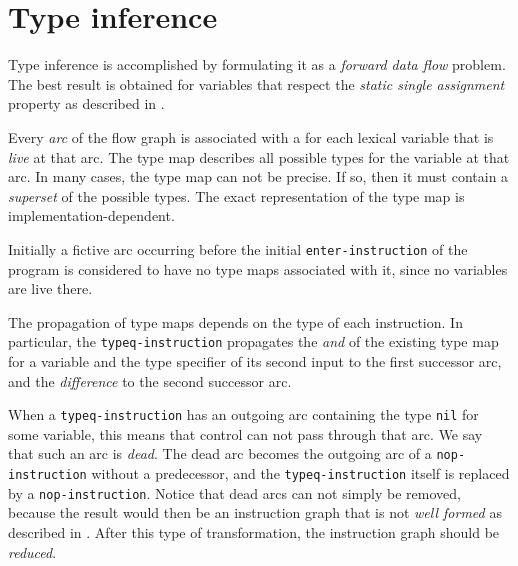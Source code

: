 \section{Type inference}

Type inference is accomplished by formulating it as a \emph{forward
  data flow} problem.  The best result is obtained for variables that
respect the \emph{static single assignment} property as described in
. 

Every \emph{arc} of the flow graph is associated with a  for each lexical variable that is \emph{live} at that arc.  The
type map describes all possible types for the variable at that arc.
In many cases, the type map can not be precise.  If so, then it must
contain a \emph{superset} of the possible types.  The exact
representation of the type map is implementation-dependent. 

Initially a fictive arc occurring before the initial
\texttt{enter-instruction} of the program is considered to have no
type maps associated with it, since no variables are live there.  

The propagation of type maps depends on the type of each instruction.
In particular, the \texttt{typeq-instruction} propagates the
\emph{and} of the existing type map for a variable and the type
specifier of its second input to the first successor arc, and the
\emph{difference} to the second successor arc.  

When a \texttt{typeq-instruction} has an outgoing arc containing the
type \texttt{nil} for some variable, this means that control can not
pass through that arc.  We say that such an arc is \emph{dead}. 
The dead arc becomes the outgoing arc of a
\texttt{nop-instruction} without a predecessor, and the
\texttt{typeq-instruction} itself is replaced by a
\texttt{nop-instruction}.%
Notice that dead arcs can not simply be removed, because the result
would then be an instruction graph that is not \emph{well formed} as
described in .  After this type of transformation,
the instruction graph should be
\emph{reduced}.  

